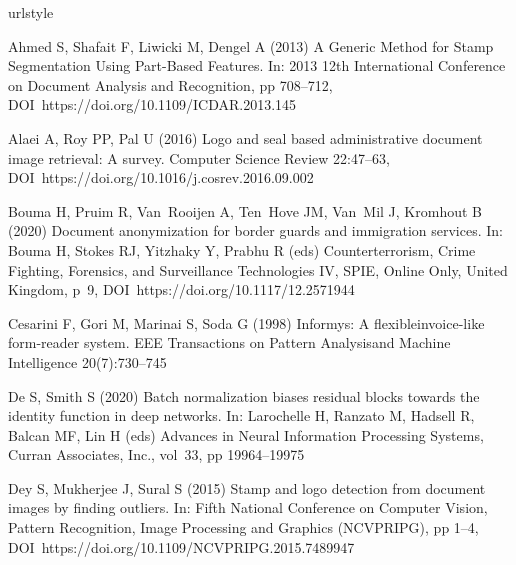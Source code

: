 \documentclass[twocolumn]{svjour3}
\begin{document}

\begin{thebibliography}{43}
	\providecommand{\natexlab}[1]{#1}
	\providecommand{\url}[1]{{#1}}
	\providecommand{\urlprefix}{URL }
	\expandafter\ifx\csname urlstyle\endcsname\relax
	\providecommand{\doi}[1]{DOI~\discretionary{}{}{}#1}\else
	\providecommand{\doi}{DOI~\discretionary{}{}{}\begingroup
		\urlstyle{rm}\Url}\fi
	\providecommand{\eprint}[2][]{\url{#2}}
	
	Ahmed S, Shafait F, Liwicki M, Dengel A (2013) A {Generic} {Method} for {Stamp}
	{Segmentation} {Using} {Part}-{Based} {Features}. In: 2013 12th
	{International} {Conference} on {Document} {Analysis} and {Recognition}, pp
	708--712, \doi{https://doi.org/10.1109/ICDAR.2013.145}
	
	Alaei A, Roy PP, Pal U (2016) Logo and seal based administrative document image
	retrieval: A survey. Computer Science Review 22:47--63,
	\doi{https://doi.org/10.1016/j.cosrev.2016.09.002}
	
	Bouma H, Pruim R, Van~Rooijen A, Ten~Hove JM, Van~Mil J, Kromhout B (2020)
	Document anonymization for border guards and immigration services. In: Bouma
	H, Stokes RJ, Yitzhaky Y, Prabhu R (eds) Counterterrorism, {Crime}
	{Fighting}, {Forensics}, and {Surveillance} {Technologies} {IV}, SPIE, Online
	Only, United Kingdom, p~9, \doi{https://doi.org/10.1117/12.2571944}
	
	Cesarini F, Gori M, Marinai S, Soda G (1998) Informys: A flexibleinvoice-like
	form-reader system. EEE Transactions on Pattern Analysisand Machine
	Intelligence 20(7):730–745
	
	De S, Smith S (2020) Batch normalization biases residual blocks towards the
	identity function in deep networks. In: Larochelle H, Ranzato M, Hadsell R,
	Balcan MF, Lin H (eds) Advances in Neural Information Processing Systems,
	Curran Associates, Inc., vol~33, pp 19964--19975
	
	Dey S, Mukherjee J, Sural S (2015) Stamp and logo detection from document
	images by finding outliers. In: Fifth National Conference on Computer Vision,
	Pattern Recognition, Image Processing and Graphics (NCVPRIPG), pp 1--4,
	\doi{https://doi.org/10.1109/NCVPRIPG.2015.7489947}
	

\end{thebibliography}
\end{document}
